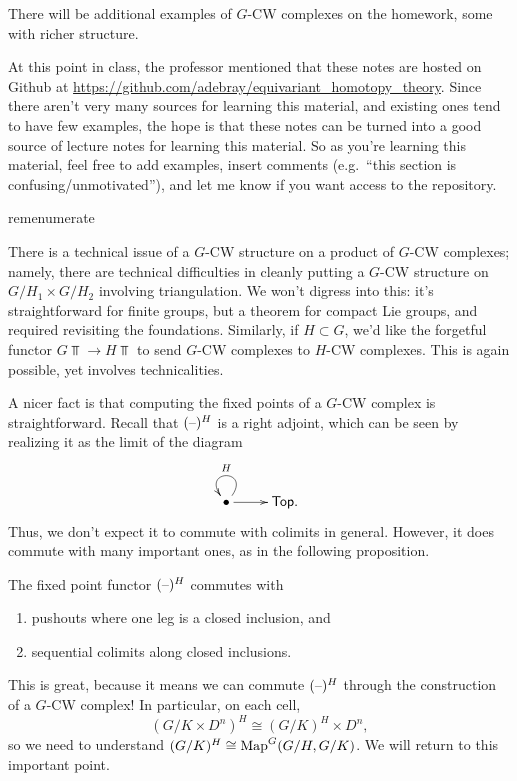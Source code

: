 There will be additional examples of $G$-CW complexes on the homework, some with richer structure.
\begin{rem}
At this point in class, the professor mentioned that these notes are hosted on Github at
\url{https://github.com/adebray/equivariant_homotopy_theory}. Since there aren't very many sources for learning
this material, and existing ones tend to have few examples, the hope is that these notes can be turned into a good
source of lecture notes for learning this material. So as you're learning this material, feel free to add
examples, insert comments (e.g.\ ``this section is confusing/unmotivated''), and let me know if you want access to
the repository.
\end{rem}
\begin{comp}{rem}{enumerate}
	\item There is a technical issue of a $G$-CW structure on a product of $G$-CW complexes; namely, there are
	technical difficulties in cleanly putting a $G$-CW structure on $G/H_1\times G/H_2$ involving triangulation.
	We won't digress into this: it's straightforward for finite groups, but a theorem for compact Lie groups, and
	required revisiting the foundations. Similarly, if $H\subset G$, we'd like the forgetful functor $G\Top\to
	H\Top$ to send $G$-CW complexes to $H$-CW complexes. This is again possible, yet involves technicalities.
	\item A nicer fact is that computing the fixed points of a $G$-CW complex is straightforward. Recall that
	$(\text{--})^H$ is a right adjoint, which can be seen by realizing it as the limit of the diagram
	\[\xymatrix{
		\bullet\ar@(ur, ul)_H\ar[r] & \Top.
	}\]
	Thus, we don't expect it to commute with colimits in general. However, it does commute with many important
	ones, as in the following proposition.\qedhere
\end{comp}
\begin{prop}
The fixed point functor $(\text{--})^H$ commutes with
\begin{enumerate}
	\item pushouts where one leg is a closed inclusion, and
	\item sequential colimits along closed inclusions.
\end{enumerate}
\end{prop}
This is great, because it means we can commute $(\text{--})^H$ through the construction of a $G$-CW complex! In
particular, on each cell,
\[(G/K\times D^n)^H\cong (G/K)^H\times D^n,\]
so we need to understand $(G/K)^H\cong\operatorname{Map}^G(G/H,G/K)$. We will return to this important point.
